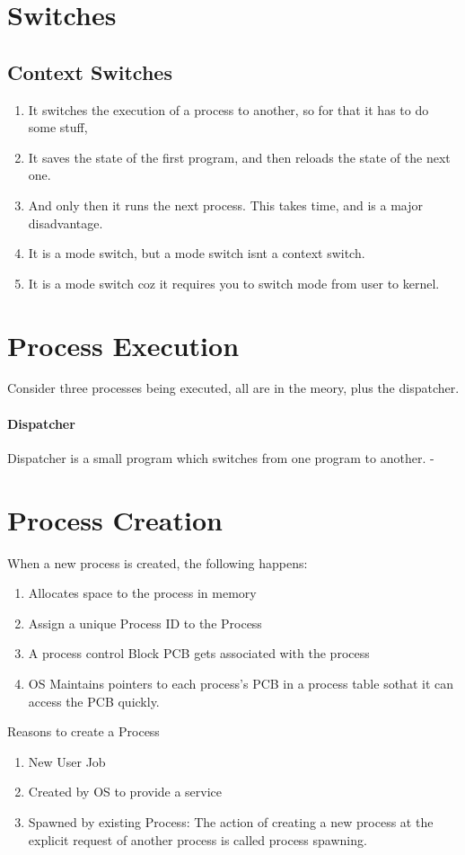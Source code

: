 \documentclass[11pt]{article}
\begin{document}
\section{Switches}
\subsection{Context Switches}
\begin{enumerate}
	\item It switches the execution of a process to another, so for that it has to do some stuff,
	\item It saves the state of the first program, and then reloads the state of the next one.
	\item And only then it runs the next process. This takes time, and is a major disadvantage.
	\item It is a mode switch, but a mode switch isnt a context switch.
	\item It is a mode switch coz it requires you to switch mode from user to kernel.
\end{enumerate}

\section{Process Execution}
Consider three processes being executed, all are in the meory, plus the dispatcher.
\paragraph{Dispatcher}
Dispatcher is a small program which switches from one program to another. -

\section{Process Creation}
When a new process is created, the following happens:
\begin{enumerate}
	\item Allocates space to the process in memory
	\item Assign a unique Process ID to the Process
	\item A process control Block PCB gets associated with the process
	\item OS Maintains pointers to each process's PCB in a process table sothat it can access the PCB quickly.
\end{enumerate}

Reasons to create a Process
\begin{enumerate}
	\item New User Job
	\item Created by OS to provide a service
	\item Spawned by existing Process: The action of creating a new process at the explicit request of another process is called process spawning.
\end{enumerate}
\end{document}
